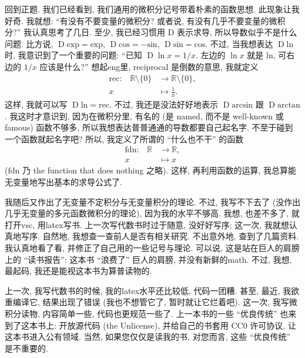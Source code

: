 回到正题.
我们已经看到, 我们通用的微积分记号带着朴素的函数思想.
此现象让我好奇.
我就想:
``有没有不要变量的微积分?
或者说, 有没有几乎不要变量的微积分?''
我认真思考了几日.
至少, 我已经习惯用 $\mathrm{D}$ 表示求导,
所以导数似乎不是什么问题.
比方说,
$\operatorname{D} \mathrm{exp} = \mathrm{exp}$,
$\operatorname{D} \mathrm{cos} = -\mathrm{sin}$,
$\operatorname{D} \mathrm{sin} = \mathrm{cos}$.
不过,
当我想表达 $\operatorname{D} \mathrm{ln}$ 时,
我意识到了一个重要的问题:
``已知 $\operatorname{D} \ln {x} = 1/x$.
左边的 $\ln {x}$ 就是 $\mathrm{ln}$,
可右边的 $1/x$ 应该是什么?''
想起\gls{eng}里, reciprocal 是倒数的意思, 我就定义
\begin{align*}
    \text{$\mathrm{rec}$:} \quad
    \mathbb{R} \setminus \{ 0 \} & \to \mathbb{R} \setminus \{ 0 \}, \\
    x                            & \mapsto \frac{1}{x}.
\end{align*}
这样, 我就可以写
$\operatorname{D} \mathrm{ln} = \mathrm{rec}$.
不过, 我还是没法好好地表示
$\operatorname{D} \mathrm{arcsin}$
跟
$\operatorname{D} \mathrm{arctan}$.
我这时才意识到,
因为在微积分里,
有名的 (是 named, 而不是 well-known 或 famous) 函数不够多,
所以我想表达普普通通的导数都要自己起名字.
不至于碰到一个函数就起名字吧?
所以, 我定义了所谓的 ``什么也不干'' 的函数
\begin{align*}
    \text{$\mathrm{fdn}$:} \quad
    \mathbb{R} & \to \mathbb{R}, \\
    x          & \mapsto x
\end{align*}
($\mathrm{fdn}$ 乃 the function that does nothing 之略).
这样, 再利用函数的运算,
我总算能无变量地写出基本的求导公式了.

我随后又作出了无变量不定积分与无变量积分的理论.
不过, 我写不下去了
(没作出几乎无变量的多元函数微积分的理论),
因为我的水平不够高.
我想, 也差不多了, 就打开\gls{vsc}, 用\gls{latex}写书.
上一次写代数书时过于随意, 没好好写序;
这一次, 我就想认真地写序.
自然地, 我想查一查前人是否有相关研究.
不出意外地, 查到了几篇资料.
我认真地看了看, 并修正了自己用的一些记号与理论.
可以说, 这是站在巨人的肩膀上的 ``读书报告'':
这本书 ``浪费了'' 巨人的肩膀, 并没有新鲜的\gls{math}.
不过, 我想, 最起码, 我还是能视这本书为算普读物的.

上一次, 我写代数书的时候, 我的\gls{latex}水平还比较低, 代码一团糟.
甚至, 最近, 我欲重编译它, 结果出现了错误
(我也不想管它了, 暂时就让它烂着吧).
这一次, 我写微积分读物, 内容简单一些, 代码也更规范一些了.
上一本书的一些 ``优良传统'' 也来到了这本书上:
开放源代码 (the Unlicense),
并给自己的书套用 CC0 许可协议, 让这本书进入公有领域.
当然, 如果您仅仅是读我的书, 对您而言,
这些 ``优良传统'' 是不重要的.

